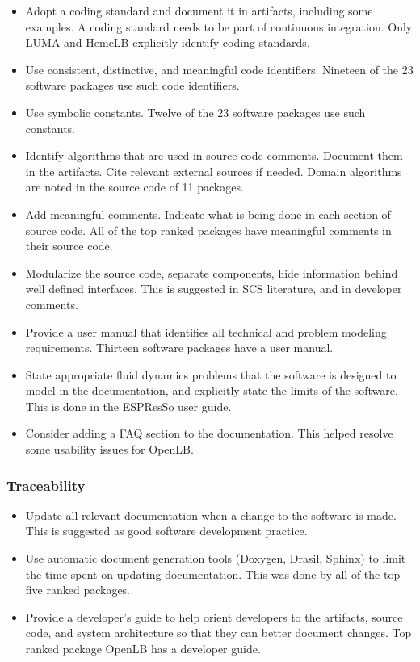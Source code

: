 \documentclass[final, 3p, times, authoryear]{elsarticle}
\begin{document}
\begin{itemize}
	\item Adopt a coding standard and document it in artifacts, including some
	examples. A coding standard needs to be part of continuous integration. Only
	LUMA and HemeLB explicitly identify coding standards. 
	\item Use consistent, distinctive, and meaningful code identifiers. Nineteen
	of the 23 software packages use such code identifiers.
	\item Use symbolic constants. Twelve of the 23 software packages use such
	constants.
	\item Identify algorithms that are used in source code comments. Document
	them in the artifacts. Cite relevant external sources if needed. Domain
	algorithms are noted in the source code of 11 packages.
	\item Add meaningful comments. Indicate what is being done in each section
	of source code. All of the top ranked packages have meaningful comments in
	their source code.
	\item Modularize the source code, separate components, hide information
	behind well defined interfaces. This is suggested in SCS literature, and in
	developer comments.
	\item Provide a user manual that identifies all technical and problem
	modeling requirements. Thirteen software packages have a user manual.
	\item State appropriate fluid dynamics problems that the software is
	designed to model in the documentation, and explicitly state the limits of
	the software. This is done in the ESPResSo user guide. 
	\item Consider adding a FAQ section to the documentation. This helped
	resolve some usability issues for OpenLB.
\end{itemize}

\subsubsection{Traceability}

\begin{itemize}
	\item Update all relevant documentation when a change to the software is
	made. This is suggested as good software development practice.
	\item Use automatic document generation tools (Doxygen, Drasil, Sphinx) to
	limit the time spent on updating documentation. This was done by all of the
	top five ranked packages.
	\item Provide a developer's guide to help orient developers to the
	artifacts, source code, and system architecture so that they can better
	document changes. Top ranked package OpenLB has a developer guide. 
\end{itemize}
\end{document}
